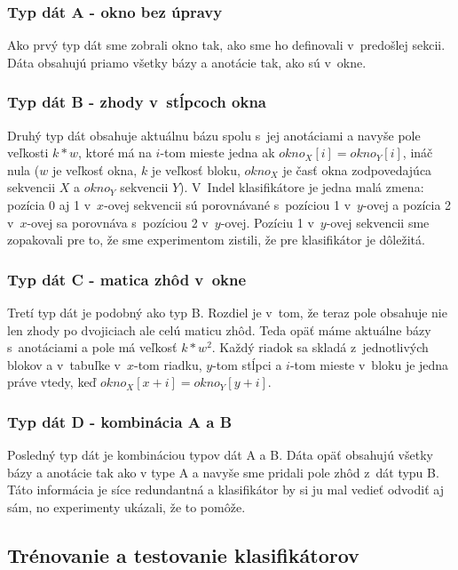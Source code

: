 \subsubsection{Typ dát A - okno bez úpravy}

Ako prvý typ dát sme zobrali okno tak, ako sme ho definovali v~predošlej sekcii. Dáta obsahujú priamo všetky bázy a anotácie tak, ako sú v~okne.

\subsubsection{Typ dát B - zhody v~stĺpcoch okna}

Druhý typ dát obsahuje aktuálnu bázu spolu s~jej anotáciami a navyše pole veľkosti $k*w$,
ktoré má na $i$-tom mieste jedna ak $okno_X[i] = okno_Y[i]$, ináč nula
($w$ je veľkosť okna, $k$ je veľkosť bloku, $okno_X$ je časť okna zodpovedajúca sekvencii $X$ a $okno_Y$ sekvencii $Y$).
V~Indel klasifikátore je jedna malá zmena: pozícia 0 aj 1 v~$x$-ovej sekvencii sú porovnávané s~pozíciou 1 v~$y$-ovej a pozícia 2 v~$x$-ovej sa porovnáva s~pozíciou 2 v~$y$-ovej.
Pozíciu 1 v~$y$-ovej sekvencii sme zopakovali pre to, že sme experimentom zistili, že pre klasifikátor je dôležitá.

\subsubsection{Typ dát C - matica zhôd v~okne}

Tretí typ dát je podobný ako typ B. Rozdiel je v~tom, že teraz pole obsahuje nie len zhody po dvojiciach ale celú maticu zhôd. Teda opäť máme aktuálne bázy s~anotáciami a pole má veľkosť $k*w^2$. Každý riadok sa skladá z~jednotlivých blokov a v~tabuľke v~$x$-tom riadku, $y$-tom stĺpci a $i$-tom mieste v~bloku je jedna práve
vtedy, keď $okno_X[x+i] = okno_Y[y+i]$.

\subsubsection{Typ dát D - kombinácia A a B}

Posledný typ dát je kombináciou typov dát A a B. Dáta opäť obsahujú všetky bázy a anotácie tak ako v type A a navyše sme pridali pole zhôd z~dát typu B. Táto informácia je síce redundantná a klasifikátor by si ju mal vedieť odvodiť aj sám, no experimenty ukázali, že to pomôže.

\subsection{Trénovanie a testovanie klasifikátorov}

